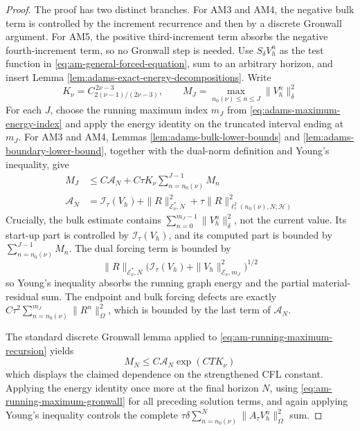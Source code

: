 \documentclass[11pt]{article}
\begin{document}
\begin{proof}
The proof has two distinct branches. For AM3 and AM4, the negative bulk term
is controlled by the increment recurrence and then by a discrete Gronwall
argument. For AM5, the positive third-increment term absorbs the negative
fourth-increment term, so no Gronwall step is needed.
Use \(S_{\delta}V_h^n\) as the test function in
\eqref{eq:am-general-forced-equation}, sum to an arbitrary horizon, and
insert Lemma \ref{lem:adams-exact-energy-decompositions}. Write
\begin{equation}
K_\nu=C_{2(\nu-1)/(2\nu-3)}^{\,2\nu-3},\qquad
M_J=\max_{n_0(\nu)\le n\le J}\|V_h^n\|_{\delta}^2
\label{eq:am-gronwall-quantities}
\end{equation}
For each \(J\), choose the running maximum index \(m_J\) from
\eqref{eq:adams-maximum-energy-index} and apply the energy identity on the
truncated interval ending at \(m_J\). For AM3 and AM4, Lemmas
\ref{lem:adams-bulk-lower-bounds} and
\ref{lem:adams-boundary-lower-bound}, together with the dual-norm definition
and Young's inequality, give
\begin{align}
M_J
&\le C\mathcal A_N
+C\tau K_\nu\sum_{n=n_0(\nu)}^{J-1}M_n
\label{eq:am-running-maximum-recursion}\\
\mathcal A_N
&=\mathcal I_{\tau}(V_h)+\|R\|_{\mathcal E_\nu^*,N}^2
+\tau\|R\|_{\ell_{\tau}^2(n_0(\nu),N;\mathcal H)}^2
\label{eq:am-stability-data-quantity}
\end{align}
Crucially, the bulk estimate contains
\(\sum_{n=0}^{m_J-1}\|V_h^n\|_{\delta}^2\), not the current value. Its
start-up part is controlled by \(\mathcal I_{\tau}(V_h)\), and its computed
part is bounded by \(\sum_{n=n_0(\nu)}^{J-1}M_n\). The dual forcing term is
bounded by
\begin{equation}
\|R\|_{\mathcal E_\nu^*,N}
\bigl(\mathcal I_{\tau}(V_h)
+\|V_h\|_{\mathcal E_\nu,m_J}^2\bigr)^{1/2}
\label{eq:am-dual-forcing-at-running-maximum}
\end{equation}
so Young's inequality absorbs the running graph energy and the partial
material-residual sum. The endpoint and bulk forcing defects are exactly
\(C\tau^2\sum_{n=n_0(\nu)}^{m_J}\|R^n\|_{\Omega}^2\), which is bounded by the
last term of \(\mathcal A_N\).

The standard discrete Gronwall lemma applied to
\eqref{eq:am-running-maximum-recursion} yields
\begin{equation}
M_N\le C\mathcal A_N\exp(C T K_\nu)
\label{eq:am-running-maximum-gronwall}
\end{equation}
which displays the claimed dependence on the strengthened CFL constant.
Applying the energy identity once more at the final horizon \(N\), using
\eqref{eq:am-running-maximum-gronwall} for all preceding solution terms, and
again applying Young's inequality controls the complete
\(\tau\delta\sum_{n=n_0(\nu)}^N\|A_{\tau}V_h^n\|_{\Omega}^2\) sum.


\end{proof}
\end{document}
